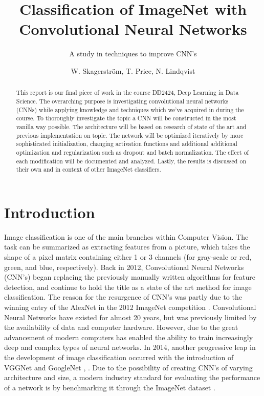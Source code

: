 \documentclass{kthreport}
\title{Classification of ImageNet with Convolutional Neural Networks}
\subtitle{A study in techniques to improve CNN's}
\author{W. Skagerström, T. Price, N. Lindqvist}
\begin{document}
\maketitle
\newpage
\begin{abstract}

\noindent
This report is our final piece of work in the course DD2424, Deep Learning in Data Science. The overarching purpose is investigating convolutional neural networks (CNNs) while applying knowledge and techniques which we've acquired in during the course.
\noindent
To thoroughly investigate the topic a CNN will be constructed in the most vanilla way possible. The architecture will be based on research of state of the art and previous implementation on topic. The network will be optimized iteratively by more sophisticated initialization, changing activation functions and additional additional optimization and regularization such as dropout and batch normalization. The effect of each modification will be documented and analyzed. Lastly, the results is discussed on their own and in context of other ImageNet classifiers.
\end{abstract}
\newpage

\tableofcontents
\newpage

\section{Introduction}
Image classification is one of the main branches within Computer Vision. The task can be summarized as extracting features from a picture, which takes the shape of a pixel matrix containing either 1 or 3 channels (for gray-scale or red, green, and blue, respectively). Back in 2012, Convolutional Neural Networks (CNN's) began replacing the previously manually written algorithms for feature detection, and continue to hold the title as a state of the art method for image classification. The reason for the resurgence of CNN's was partly due to the winning entry of the AlexNet in the 2012 ImageNet competition \cite{krizhevsky2012imagenet}. Convolutional Neural Networks have existed for almost 20 years, but was previously limited by the availability of data and computer hardware. However, due to the great advancement of modern computers has enabled the ability to train increasingly deep and complex types of neural networks. In 2014, another progressive leap in the development of image classification occurred with the introduction of VGGNet and GoogleNet \cite{simonyan2014very}, \cite{szegedy2016rethinking}.  Due to the possibility of creating CNN's of varying architecture and size, a modern industry standard for evaluating the performance of a network is by benchmarking it through the ImageNet dataset \cite{russakovsky2015imagenet}.
\end{document}
